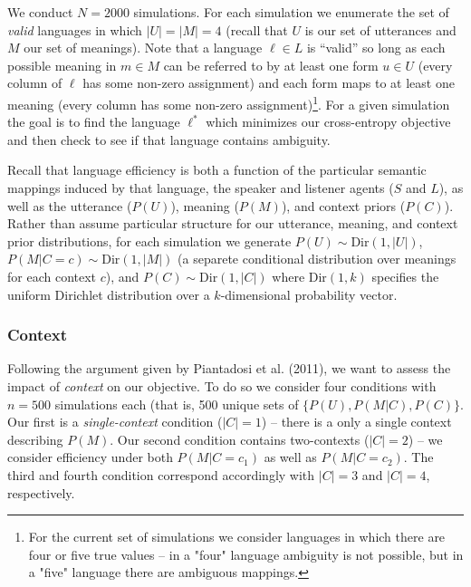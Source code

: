 \documentclass[10pt, letterpaper]{article}
\begin{document}
We conduct \(N=2000\) simulations. For each simulation we enumerate the
set of \emph{valid} languages in which \(|U|=|M|=4\) (recall that \(U\)
is our set of utterances and \(M\) our set of meanings). Note that a
language \(\ell \in L\) is ``valid'' so long as each possible meaning in
\(m \in M\) can be referred to by at least one form \(u \in U\) (every
column of \(\ell\) has some non-zero assignment) and each form maps to
at least one meaning (every column has some non-zero
assignment)\footnote{For the current set of simulations we consider languages in which there are four or five true values -- in a "four" language ambiguity is not possible, but in a "five" language there are ambiguous mappings.}.
For a given simulation the goal is to find the language \(\ell^*\) which
minimizes our cross-entropy objective and then check to see if that
language contains ambiguity.\par

Recall that language efficiency is both a function of the particular
semantic mappings induced by that language, the speaker and listener
agents (\(S\) and \(L\)), as well as the utterance (\(P(U)\)), meaning
(\(P(M)\)), and context priors (\(P(C)\)). Rather than assume particular
structure for our utterance, meaning, and context prior distributions,
for each simulation we generate \(P(U) \sim \text{Dir}(1, |U|)\),
\(P(M|C=c) \sim \text{Dir}(1, |M|)\) (a separete conditional
distribution over meanings for each context \(c\)), and
\(P(C) \sim \text{Dir}(1, |C|)\) where \(\text{Dir}(1, k)\) specifies
the uniform Dirichlet distribution over a \(k\)-dimensional probability
vector.\par

\subsubsection{Context}\label{context}

Following the argument given by Piantadosi et al. (2011), we want to
assess the impact of \emph{context} on our objective. To do so we
consider four conditions with \(n=500\) simulations each (that is, 500
unique sets of \(\{P(U), P(M|C), P(C)\}\). Our first is a
\emph{single-context} condition (\(|C|=1\)) -- there is a only a single
context describing \(P(M)\). Our second condition contains two-contexts
(\(|C| = 2\)) -- we consider efficiency under both \(P(M|C=c_1)\) as
well as \(P(M|C=c_2)\). The third and fourth condition correspond
accordingly with \(|C|=3\) and \(|C| = 4\), respectively.\par
\end{document}

